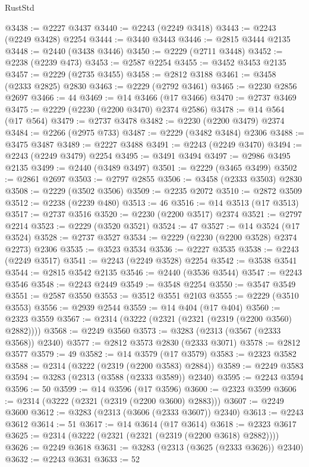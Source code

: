 \begin{lexlean}{RustStd}
\begin{coremodule}
@3438 := @2227 @3437
@3440 := @2243 (@2249 @3418)
@3443 := @2243 (@2249 @3428) @2254
@3444 := @3440 @3443
@3446 := @2815 @3444 @2135
@3448 := @2440 (@3438 @3446)
@3450 := @2229 (@2711 @3448)
@3452 := @2238 (@2239 @473)
@3453 := @2587 @2254
@3455 := @3452 @3453 @2135
@3457 := @2229 (@2735 @3455)
@3458 := @2812 @3188
@3461 := @3458 (@2333 @2825) @2830
@3463 := @2229 (@2792 @3461)
@3465 := @2230 @2856 @2697
@3466 := 44
@3469 := @14 @3466 (@17 @3466)
@3470 := @2737 @3469
@3475 := @2229 (@2230 (@2200 @3470) @2374 @2586)
@3478 := @14 @564 (@17 @564)
@3479 := @2737 @3478
@3482 := @2230 (@2200 @3479) @2374
@3484 := @2266 (@2975 @733)
@3487 := @2229 (@3482 @3484) @2306
@3488 := @3475 @3487
@3489 := @2227 @3488
@3491 := @2243 (@2249 @3470)
@3494 := @2243 (@2249 @3479) @2254
@3495 := @3491 @3494
@3497 := @2986 @3495 @2135
@3499 := @2440 (@3489 @3497)
@3501 := @2229 (@3465 @3499)
@3502 := @2861 @2697
@3503 := @2797 @2855
@3506 := @3458 (@2333 @3503) @2830
@3508 := @2229 (@3502 @3506)
@3509 := @2235 @2072
@3510 := @2872 @3509
@3512 := @2238 (@2239 @480)
@3513 := 46
@3516 := @14 @3513 (@17 @3513)
@3517 := @2737 @3516
@3520 := @2230 (@2200 @3517) @2374
@3521 := @2797 @2214
@3523 := @2229 (@3520 @3521)
@3524 := 47
@3527 := @14 @3524 (@17 @3524)
@3528 := @2737 @3527
@3534 := @2229 (@2230 (@2200 @3528) @2374 @2273) @2306
@3535 := @3523 @3534
@3536 := @2227 @3535
@3538 := @2243 (@2249 @3517)
@3541 := @2243 (@2249 @3528) @2254
@3542 := @3538 @3541
@3544 := @2815 @3542 @2135
@3546 := @2440 (@3536 @3544)
@3547 := @2243 @3546
@3548 := @2243 @2449
@3549 := @3548 @2254
@3550 := @3547 @3549
@3551 := @2587 @3550
@3553 := @3512 @3551 @2103
@3555 := @2229 (@3510 @3553)
@3556 := @2939 @2544
@3559 := @14 @404 (@17 @404)
@3560 := @2323 @3559
@3567 := @2314 (@3222 (@2321 (@2321 (@2319 (@2200 @3560) @2882))))
@3568 := @2249 @3560
@3573 := @3283 (@2313 (@3567 (@2333 @3568)) @2340)
@3577 := @2812 @3573 @2830 (@2333 @3071)
@3578 := @2812 @3577
@3579 := 49
@3582 := @14 @3579 (@17 @3579)
@3583 := @2323 @3582
@3588 := @2314 (@3222 (@2319 (@2200 @3583) @2884))
@3589 := @2249 @3583
@3594 := @3283 (@2313 (@3588 (@2333 @3589)) @2340)
@3595 := @2243 @3594
@3596 := 50
@3599 := @14 @3596 (@17 @3596)
@3600 := @2323 @3599
@3606 := @2314 (@3222 (@2321 (@2319 (@2200 @3600) @2883)))
@3607 := @2249 @3600
@3612 := @3283 (@2313 (@3606 (@2333 @3607)) @2340)
@3613 := @2243 @3612
@3614 := 51
@3617 := @14 @3614 (@17 @3614)
@3618 := @2323 @3617
@3625 := @2314 (@3222 (@2321 (@2321 (@2319 (@2200 @3618) @2882))))
@3626 := @2249 @3618
@3631 := @3283 (@2313 (@3625 (@2333 @3626)) @2340)
@3632 := @2243 @3631
@3633 := 52

\end{coremodule}
\end{lexlean}
